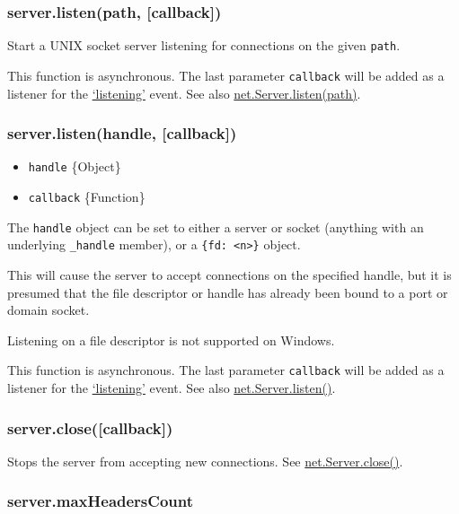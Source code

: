 \subsubsection{server.listen(path,
{[}callback{]})}\label{server.listenpath-callback}

Start a UNIX socket server listening for connections on the given
\texttt{path}.

This function is asynchronous. The last parameter \texttt{callback} will
be added as a listener for the
\href{net.html\#net_event_listening}{`listening'} event. See also
\href{net.html\#net_server_listen_path_callback}{net.Server.listen(path)}.

\subsubsection{server.listen(handle,
{[}callback{]})}\label{server.listenhandle-callback}

\begin{itemize}
\itemsep1pt\parskip0pt
\item
  \texttt{handle} \{Object\}
\item
  \texttt{callback} \{Function\}
\end{itemize}

The \texttt{handle} object can be set to either a server or socket
(anything with an underlying \texttt{\_handle} member), or a
\texttt{\{fd: \textless{}n\textgreater{}\}} object.

This will cause the server to accept connections on the specified
handle, but it is presumed that the file descriptor or handle has
already been bound to a port or domain socket.

Listening on a file descriptor is not supported on Windows.

This function is asynchronous. The last parameter \texttt{callback} will
be added as a listener for the
\href{net.html\#event_listening_}{`listening'} event. See also
\href{net.html\#net_server_listen_handle_callback}{net.Server.listen()}.

\subsubsection{server.close({[}callback{]})}\label{server.closecallback}

Stops the server from accepting new connections. See
\href{net.html\#net_server_close_callback}{net.Server.close()}.

\subsubsection{server.maxHeadersCount}\label{server.maxheaderscount}

